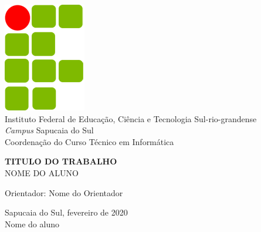 \documentclass[portuguese,12pt,oneside,a4paper]{book}
\begin{document}
\frontmatter 
\fancyhead[RO]{{\footnotesize\rightmark}\hspace{2em}\thepage}
\setcounter{tocdepth}{2}
\fancyhead[LE]{\thepage\hspace{2em}\footnotesize{\leftmark}}
\fancyhead[RE,LO]{}
\fancyhead[RO]{{\footnotesize\rightmark}\hspace{2em}\thepage}

\onehalfspacing  %


\thispagestyle{empty}
\begin{center}
    \includegraphics[scale=0.4]{ifsul} \\
    \Large Instituto Federal de Educação, Ciência e Tecnologia Sul-rio-grandense\\
    \textit{Campus} Sapucaia do Sul\\
    Coordenação do Curso Técnico em Informática\\

    \vspace*{4cm}

    \textbf{\LARGE{TITULO DO TRABALHO}}\\
    
    \vspace*{3.5cm}
    \Large{NOME DO ALUNO}
    
    \vskip 3cm

    Orientador: Nome do Orientador\\

    \vskip 3cm
    
    \normalsize{Sapucaia do Sul, fevereiro de 2020} \\
    \textregistered Nome do aluno
    
\end{center}

\newpage
\end{document}
